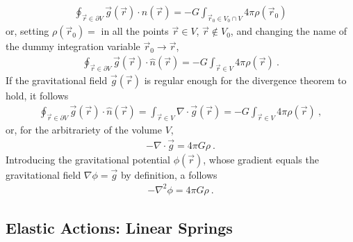 \documentclass[letterpaper,10pt,english]{jupyterBook}
\begin{document}
\begin{equation*}
\begin{split}
  \oint_{\vec{r} \in \partial V} \vec{g}(\vec{r}) \cdot \hat{n}(\vec{r}) = - G \int_{\vec{r}_0 \in V_0 \cap V} 4 \pi \rho(\vec{r}_0) 
\end{split}
\end{equation*}
\sphinxAtStartPar
or, setting \(\rho(\vec{r}_0) = \) in all the points \(\vec{r} \in V\), \(\vec{r} \notin V_0\), and changing the name of the dummy integration variable \(\vec{r}_0 \rightarrow \vec{r}\),
\begin{equation*}
\begin{split}
  \oint_{\vec{r} \in \partial V} \vec{g}(\vec{r}) \cdot \hat{n}(\vec{r}) = - G \int_{\vec{r} \in V} 4 \pi \rho(\vec{r}) \ .
\end{split}
\end{equation*}
\sphinxAtStartPar
If the gravitational field \(\vec{g}(\vec{r})\) is regular enough for the divergence theorem to hold, it follows
\begin{equation}\label{equation:ch/actions-examples:eq:g:flux:V}
\begin{split}
  \oint_{\vec{r} \in \partial V} \vec{g}(\vec{r}) \cdot \hat{n}(\vec{r}) = \int_{\vec{r} \in V} \nabla \cdot \vec{g}(\vec{r})  = - G \int_{\vec{r} \in V} 4 \pi \rho(\vec{r}) \ ,
\end{split}
\end{equation}
\sphinxAtStartPar
or, for the arbitrariety of the volume \(V\),
\begin{equation*}
\begin{split}- \nabla \cdot \vec{g} = 4 \pi G \rho \ .\end{split}
\end{equation*}
\sphinxAtStartPar
Introducing the gravitational potential \(\phi(\vec{r})\), whose gradient equals the gravitational field \(\nabla \phi = \vec{g}\) by definition, a  follows
\begin{equation}\label{equation:ch/actions-examples:eq:g:poisson}
\begin{split}- \nabla^2 \phi = 4 \pi G \rho \ .\end{split}
\end{equation}

\subsection{Elastic Actions: Linear Springs}
\label{\detokenize{ch/actions-examples:elastic-actions-linear-springs}}
\sphinxAtStartPar
{}
\end{document}
